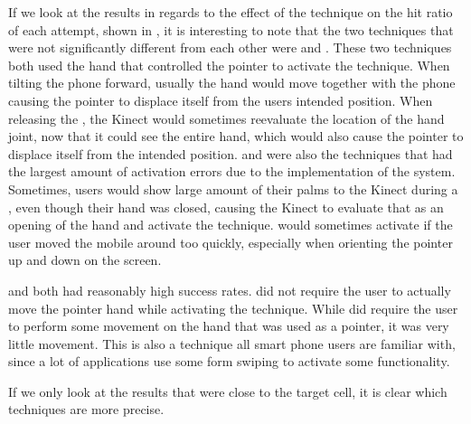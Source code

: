 If we look at the results in regards to the effect of the technique on the hit ratio of each attempt, shown in , it is interesting to note that the two techniques that were not significantly different from each other were \tilt and \pinch. These two techniques both used the hand that controlled the pointer to activate the technique. When tilting the phone forward, usually the hand would move together with the phone causing the pointer to displace itself from the users intended position. When releasing the \pinch, the Kinect would sometimes reevaluate the location of the hand joint, now that it could see the entire hand, which would also cause the pointer to displace itself from the intended position. \pinch and \tilt were also the techniques that had the largest amount of activation errors due to the implementation of the system. Sometimes, users would show large amount of their palms to the Kinect during a \pinch, even though their hand was closed, causing the Kinect to evaluate that as an opening of the hand and activate the technique. \tilt would sometimes activate if the user moved the mobile around too quickly, especially when orienting the pointer up and down on the screen.  

\swipe and \throw both had reasonably high success rates. \throw did not require the user to actually move the pointer hand while activating the technique. While \swipe did require the user to perform some movement on the hand that was used as a pointer, it was very little movement. This is also a technique all smart phone users are familiar with, since a lot of applications use some form swiping to activate some functionality.

If we only look at the results that were close to the target cell, it is clear which techniques are more precise. 

